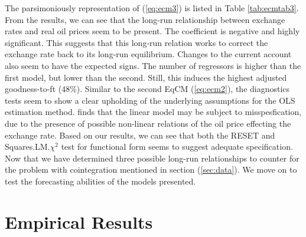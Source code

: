 \documentclass[10pt]{article}
\numberwithin{equation}{section}
\numberwithin{table}{section}
\numberwithin{figure}{section}
\begin{document}
\begin{spacing}{1.5}
\indent The parsimoniously representation of (\ref{eq:ecm3}) is listed in Table \ref{tab:ecmtab3}. From the results, we can see that the long-run relationship between exchange rates and real oil prices seem to be present. The coefficient is negative and highly significant. This suggests that this long-run relation works to correct the exchange rate back to its long-run equilibrium. Changes to the current account also seem to have the expected signs. The number of regressors is higher than the first model, but lower than the second. Still, this induces the highest adjusted goodness-to-ft (48\%). Similar to the second EqCM (\ref{eq:ecm2}), the diagnostics tests seem to show a clear upholding of the underlying assumptions for the OLS estimation method. \cite{akram2000does,akram2004oil} finds that the linear model may be subject to misspesfication, due to the presence of possible non-linear relations of the oil price effecting the exchange rate. Based on our results, we can see that both the RESET and Squares.LM.$\chi^2$ test for functional form seems to suggest adequate specification. Now that we have determined three possible long-run relationships to counter for the problem with cointegration mentioned in section (\ref{sec:data}). We move on to test the forecasting abilities of the models presented.

\section{Empirical Results}
\label{sec:res}


\end{spacing}
\end{document}
